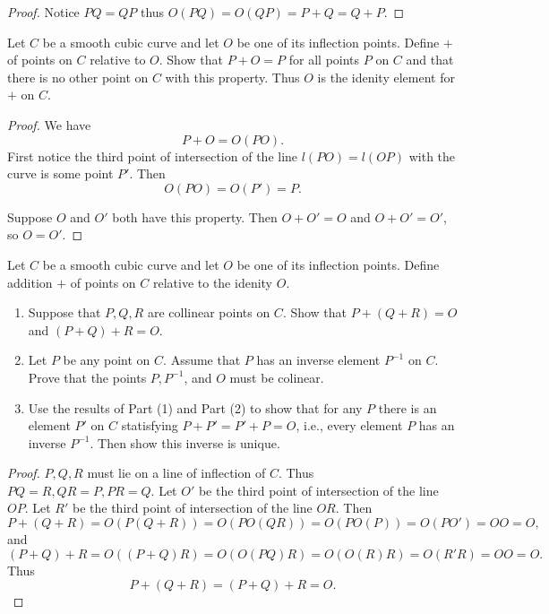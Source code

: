 \begin{proof}
    Notice $PQ = QP$ thus $O(PQ) = O(QP) = P + Q = Q + P$.
\end{proof}


\begin{tcolorbox}[title=Problem 8, breakable]
    Let $C$ be a smooth cubic curve and let $O$ be one of its inflection points.
    Define $+$ of points on $C$ relative to $O$.
    Show that $P + O = P$ for all points $P$ on $C$ and that there is no other point 
        on $C$ with this property.
    Thus $O$ is the idenity element for $+$ on $C$.
\end{tcolorbox}

\begin{proof}
    We have 
    \[P + O = O(PO).\]
    First notice the third point of intersection of the line \(l(PO) = l(OP)\) with the curve is some point \(P'\).
    Then 
    \[O(PO) = O(P') = P.\]

    Suppose \(O\) and \(O'\) both have this property.
    Then \(O + O' = O\) and \(O + O' = O'\), so \(O = O'\).
\end{proof}


\begin{tcolorbox}[title=Problem 9, breakable]
    Let $C$ be a smooth cubic curve and let $O$ be one of its inflection points.
    Define addition $+$ of points on $C$ relative to the idenity $O$.
    \begin{enumerate}
        \item Suppose that $P, Q, R$ are collinear points on $C$.
        Show that $P + (Q + R) = O$ and $(P + Q) + R = O$.
        \item Let $P$ be any point on $C$. Assume that $P$ has an inverse element $P^{-1}$ on $C$.
        Prove that the points $P, P^{-1}$, and $O$ must be colinear.
        \item Use the results of Part (1) and Part (2) to show that for any $P$ there is an element $P'$ on $C$
        statisfying $P + P' = P' + P = O$, i.e., every element $P$ has an inverse $P^{-1}$.
        Then show this inverse is unique.
    \end{enumerate}
\end{tcolorbox}

\begin{proof}
    $P, Q, R$ must lie on a line of inflection of $C$.  
    Thus $PQ = R, QR = P, PR = Q$.
    Let $O'$ be the third point of intersection of the line $OP$. 
    Let $R'$ be the third point of intersection of the line $OR$. 
    Then
    \[
        P + (Q + R) = O(P (Q + R)) = O(P O(QR)) = O(P O(P)) = O(PO') = OO = O,
    \] 
    and
    \[
        (P + Q) + R = O((P + Q) R) = O(O(PQ) R) = O(O(R) R) = O(R' R) = OO = O.
    \]
    Thus
    \[
        P + (Q + R) = (P + Q) + R = O.
    \]
\end{proof}

